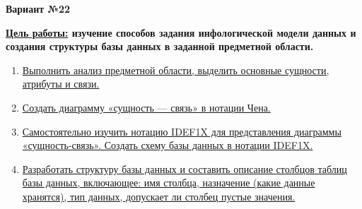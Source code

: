     \begin{center}
        {\large \textbf{Вариант №22 \\
        }}
    \end{center}

    \textbf{\underline{Цель работы:} изучение способов задания инфологической модели данных и создания структуры базы данных в заданной предметной области.
    } 

    \begin{enumerate}
        \item \hyperref[sec:1]{Выполнить анализ предметной области, выделить основные сущности, атрибуты и связи.}
        \item \hyperref[sec:2]{Создать диаграмму «сущность — связь» в нотации Чена.}
        \item \hyperref[sec:3]{Самостоятельно изучить нотацию IDEF1X для представления диаграммы «сущность-связь». Создать схему базы данных в нотации IDEF1X.}
        \item \hyperref[sec:4]{Разработать структуру базы данных и составить описание столбцов таблиц базы данных, включающее: имя столбца, назначение (какие данные хранятся), тип данных, допускает ли столбец пустые значения.}
    \end{enumerate}